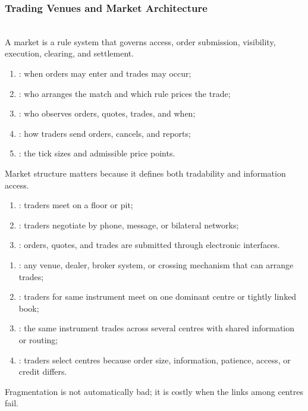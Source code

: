 \subsubsection{Trading Venues and Market Architecture}

\begin{principle} \\
A market is a rule system that governs access, order submission, visibility, execution, clearing, and settlement.
\end{principle}

\begin{taxonomy} 
\begin{enumerate}[label=\roman*.]
\setlength{\itemsep}{0pt}
\item {}: when orders may enter and trades may occur;
\item {}: who arranges the match and which rule prices the trade;
\item {}: who observes orders, quotes, trades, and when;
\item {}: how traders send orders, cancels, and reports;
\item {}: the tick sizes and admissible price points.
\end{enumerate}
Market structure matters because it defines both tradability and information access.
\end{taxonomy}

\begin{taxonomy} 
\begin{enumerate}[label=\roman*.]
\setlength{\itemsep}{0pt}
\item {}: traders meet on a floor or pit;
\item {}: traders negotiate by phone, message, or bilateral networks;
\item {}: orders, quotes, and trades are submitted through electronic interfaces.
\end{enumerate}
\end{taxonomy}

\begin{taxonomy} 
\begin{enumerate}[label=\roman*.]
\setlength{\itemsep}{0pt}
\item {}: any venue, dealer, broker system, or crossing mechanism that can arrange trades;
\item {}: traders for same instrument meet on one dominant centre or tightly linked book;
\item {}: the same instrument trades across several centres with shared information or routing;
\item {}: traders select centres because order size, information, patience, access, or credit differs.
\end{enumerate}
Fragmentation is not automatically bad; it is costly when the links among centres fail.
\end{taxonomy}

